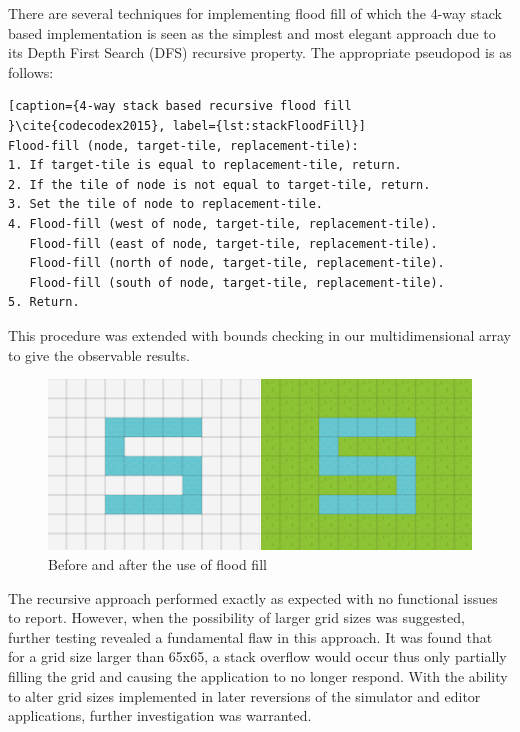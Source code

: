 There are several techniques for implementing flood fill \cite{lodev2015} of which the 4-way stack based implementation is seen as the simplest and most elegant approach due to its Depth First Search (DFS) recursive property. The appropriate pseudopod is as follows:

\begin{minipage}{0.9\textwidth}
	\begin{lstlisting}[caption={4-way stack based recursive flood fill }\cite{codecodex2015}, label={lst:stackFloodFill}]
Flood-fill (node, target-tile, replacement-tile):
1. If target-tile is equal to replacement-tile, return.
2. If the tile of node is not equal to target-tile, return.
3. Set the tile of node to replacement-tile.
4. Flood-fill (west of node, target-tile, replacement-tile).
   Flood-fill (east of node, target-tile, replacement-tile).
   Flood-fill (north of node, target-tile, replacement-tile).
   Flood-fill (south of node, target-tile, replacement-tile).
5. Return.
	\end{lstlisting}
\end{minipage}

This procedure was extended with bounds checking in our multidimensional array to give the observable results.

\begin{figure}[h]
	\begin{center}
		\includegraphics[scale=0.8]{img/floodFill.png}
		\caption[Flood Fill]{Before and after the use of flood fill}
	\label{fig:floodfill}
	\end{center}
\end{figure}

The recursive approach performed exactly as expected with no functional issues  to report. However, when the possibility of larger grid sizes was suggested, further testing revealed a fundamental flaw in this approach. It was found that for a grid size larger than 65x65, a stack overflow would occur thus only partially filling the grid and causing the application to no longer respond. With the ability to alter grid sizes implemented in later reversions of the simulator and editor applications, further investigation was warranted.

